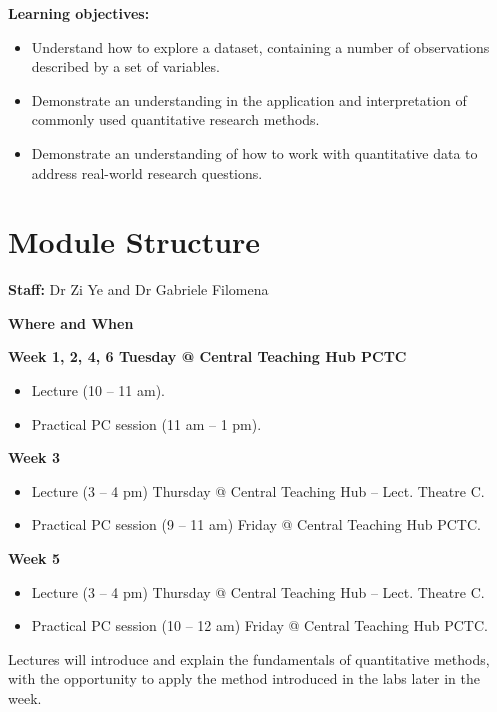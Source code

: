 \documentclass[
  letterpaper,
  DIV=11,
  numbers=noendperiod]{scrreprt}
\providecommand{\tightlist}{%
  \setlength{\itemsep}{0pt}\setlength{\parskip}{0pt}}\usepackage{longtable,booktabs,array}
\begin{document}
\textbf{Learning objectives:}

\begin{itemize}
\tightlist
\item
  Understand how to explore a dataset, containing a number of
  observations described by a set of variables.
\item
  Demonstrate an understanding in the application and interpretation of
  commonly used quantitative research methods.
\item
  Demonstrate an understanding of how to work with quantitative data to
  address real-world research questions.
\end{itemize}

\section*{Module Structure}\label{module-structure}


\textbf{Staff:} Dr Zi Ye and Dr Gabriele Filomena

\textbf{Where and When}

\textbf{Week 1, 2, 4, 6 Tuesday @ Central Teaching Hub PCTC}

\begin{itemize}
\tightlist
\item
  Lecture (10 -- 11 am).
\item
  Practical PC session (11 am -- 1 pm).
\end{itemize}

\textbf{Week 3}

\begin{itemize}
\tightlist
\item
  Lecture (3 -- 4 pm) Thursday @ Central Teaching Hub -- Lect. Theatre
  C.
\item
  Practical PC session (9 -- 11 am) Friday @ Central Teaching Hub PCTC.
\end{itemize}

\textbf{Week 5}

\begin{itemize}
\tightlist
\item
  Lecture (3 -- 4 pm) Thursday @ Central Teaching Hub -- Lect. Theatre
  C.
\item
  Practical PC session (10 -- 12 am) Friday @ Central Teaching Hub PCTC.
\end{itemize}

Lectures will introduce and explain the fundamentals of quantitative
methods, with the opportunity to apply the method introduced in the labs
later in the week.
\end{document}
